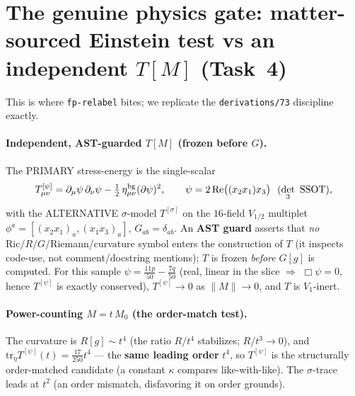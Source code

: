 \documentclass[11pt]{article}
\newcommand{\half}{\tfrac12}
\theoremstyle{definition}\newtheorem{remark}{Remark}
\theoremstyle{plain}\newtheorem{proposition}{Proposition}
\begin{document}
\section{The genuine physics gate: matter-sourced Einstein test vs an independent $T[M]$ (Task~4)}
This is where \texttt{fp-relabel} bites; we replicate the \texttt{derivations/73} discipline exactly.

\paragraph{Independent, AST-guarded $T[M]$ (frozen before $G$).}
The PRIMARY stress-energy is the single-scalar
\begin{equation}\label{eq:Tpsi}
  T^{[\psi]}_{\mu\nu}=\partial_\mu\psi\,\partial_\nu\psi-\half\,\eta^{\rm bg}_{\mu\nu}(\partial\psi)^2,
  \qquad \psi=2\,\mathrm{Re}\bigl((x_2 x_1)x_3\bigr)\ \ (\det_3\ \text{SSOT}),
\end{equation}
with the ALTERNATIVE $\sigma$-model $T^{[\sigma]}$ on the $16$-field $V_{1/2}$ multiplet
$\phi^a=[(x_2x_1)_a,(x_1x_3)_a]$, $G_{ab}=\delta_{ab}$. An \textbf{AST guard} asserts that \emph{no}
$\mathrm{Ric}/R/G/$Riemann/curvature symbol enters the construction of $T$ (it inspects code-use, not
comment/docstring mentions); $T$ is frozen \emph{before} $G[g]$ is computed. For this sample
$\psi=\tfrac{11p}{50}-\tfrac{7q}{50}$ (real, linear in the slice $\Rightarrow$ $\Box\psi=0$, hence
$T^{[\psi]}$ is exactly conserved), $T^{[\psi]}\to0$ as $\|M\|\to0$, and $T$ is $V_1$-inert.

\paragraph{Power-counting $M=t\,M_0$ (the order-match test).}
The curvature is $R[g]\sim t^4$ (the ratio $R/t^4$ stabilizes; $R/t^3\to0$), and
$\mathrm{tr}_\eta T^{[\psi]}(t)=\tfrac{17}{250}t^4$ --- the \textbf{same leading order} $t^4$, so $T^{[\psi]}$
is the structurally order-matched candidate (a constant $\kappa$ compares like-with-like). The
$\sigma$-trace leads at $t^2$ (an order mismatch, disfavoring it on order grounds).
\end{document}
